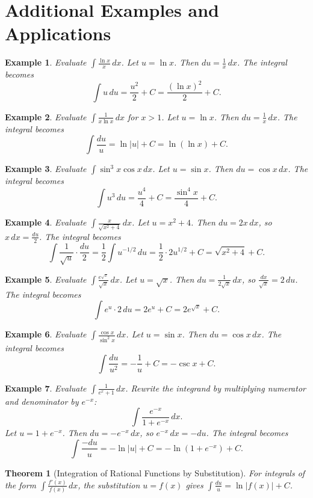 \documentclass[11pt,a4paper]{article}
\newtheorem{example}{Example}
\newtheorem{theorem}{Theorem}
\begin{document}
\section{Additional Examples and Applications}
\begin{example}
Evaluate $\displaystyle \int \frac{\ln x}{x} \, dx$.
Let $u = \ln x$. Then $du = \frac{1}{x} \, dx$. The integral becomes
\[
\int u \, du = \frac{u^2}{2} + C = \frac{(\ln x)^2}{2} + C.
\]
\end{example}
\begin{example}
Evaluate $\displaystyle \int \frac{1}{x \ln x} \, dx$ for $x > 1$.
Let $u = \ln x$. Then $du = \frac{1}{x} \, dx$. The integral becomes
\[
\int \frac{du}{u} = \ln|u| + C = \ln(\ln x) + C.
\]
\end{example}
\begin{example}
Evaluate $\displaystyle \int \sin^3 x \cos x \, dx$.
Let $u = \sin x$. Then $du = \cos x \, dx$. The integral becomes
\[
\int u^3 \, du = \frac{u^4}{4} + C = \frac{\sin^4 x}{4} + C.
\]
\end{example}
\begin{example}
Evaluate $\displaystyle \int \frac{x}{\sqrt{x^2 + 4}} \, dx$.
Let $u = x^2 + 4$. Then $du = 2x \, dx$, so $x \, dx = \frac{du}{2}$. The integral becomes
\[
\int \frac{1}{\sqrt{u}} \cdot \frac{du}{2} = \frac{1}{2} \int u^{-1/2} \, du = \frac{1}{2} \cdot 2 u^{1/2} + C = \sqrt{x^2 + 4} + C.
\]
\end{example}
\begin{example}
Evaluate $\displaystyle \int \frac{e^{\sqrt{x}}}{\sqrt{x}} \, dx$.
Let $u = \sqrt{x}$. Then $du = \frac{1}{2\sqrt{x}} \, dx$, so $\frac{dx}{\sqrt{x}} = 2 \, du$. The integral becomes
\[
\int e^u \cdot 2 \, du = 2e^u + C = 2e^{\sqrt{x}} + C.
\]
\end{example}
\begin{example}
Evaluate $\displaystyle \int \frac{\cos x}{\sin^2 x} \, dx$.
Let $u = \sin x$. Then $du = \cos x \, dx$. The integral becomes
\[
\int \frac{du}{u^2} = -\frac{1}{u} + C = -\csc x + C.
\]
\end{example}
\begin{example}
Evaluate $\displaystyle \int \frac{1}{e^x + 1} \, dx$.
Rewrite the integrand by multiplying numerator and denominator by $e^{-x}$:
\[
\int \frac{e^{-x}}{1 + e^{-x}} \, dx.
\]
Let $u = 1 + e^{-x}$. Then $du = -e^{-x} \, dx$, so $e^{-x} \, dx = -du$. The integral becomes
\[
\int \frac{-du}{u} = -\ln|u| + C = -\ln(1 + e^{-x}) + C.
\]
\end{example}
\begin{theorem}[Integration of Rational Functions by Substitution]
For integrals of the form $\displaystyle \int \frac{f'(x)}{f(x)} \, dx$, the substitution $u = f(x)$ gives $\displaystyle \int \frac{du}{u} = \ln|f(x)| + C$.
\end{theorem}
\end{document}
